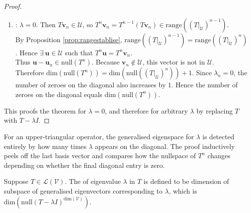 \begin{theorem}
\begin{proof}
\begin{enumerate}[label=\roman*.]
Therefore $\text{null}(T^n) = \text{null}((T|_{\mathcal{U}})^n)$, so the number of zeroes on the diagonal equals $\text{dim}(\text{null}(T^n))$.
\item[Case $2$]: $\lambda = 0$. Then $T \mathbf{v}_n \in \mathcal{U}$, so $T^n \mathbf{v}_n = T^{n-1}(T \mathbf{v}_n) \in \text{range}((T|_{\mathcal{U}})^{n-1})$.\\
By Proposition \ref{prop:rangestablise}, $\text{range}((T|_{\mathcal{U}})^{n-1}) = \text{range}((T|_{\mathcal{U}})^{n})$. Hence $\exists \ \mathbf{u} \in \mathcal{U}$ such that $T^n \mathbf{u} = T^n \mathbf{v}_n$.\\
Thus $\mathbf{u} - \mathbf{u}_n \in \text{null}(T^n)$. Because $\mathbf{v}_n \notin \mathcal{U}$, this vector is not in $\mathcal{U}$.\\
Therefore $\text{dim}(\text{null}(T^n)) = \text{dim}(\text{null}((T|_{\mathcal{U}})^{n})) + 1$. Since $\lambda_n = 0$, the number of zeroes on the diagonal also increases by $1$. Hence the number of zeroes on the diagonal equals $\text{dim}(\text{null}(T^n))$.
\end{enumerate}
This proofs the theorem for $\lambda = 0$, and therefore for arbitrary $\lambda$ by replacing $T$ with $T - \lambda I$.
\end{proof}
\end{theorem}

For an upper-triangular operator, the generalised eigenspace for $\lambda$ is detected entirely by how many times $\lambda$ appears on the diagonal. The proof inductively peels off the last basis vector and compares how the nullspace of $T^n$ changes depending on whether the final diagonal entry is zero.

\begin{definition} Suppose $T \in \mathcal{L}(\mathcal{V})$. The  of eigenvalue $\lambda$ in $T$ is defined to be dimension of subspace of generalised eigenvectors corresponding to $\lambda$, which is $\text{dim}(\text{null}(T - \lambda I)^{\text{dim}(\mathcal{V})})$.
\end{definition}

